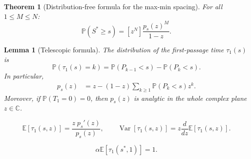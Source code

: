 \documentclass[10pt,a4paper]{amsart}
\newtheorem{lem}{Lemma}
\newtheorem{thm}{Theorem}
\def\C{{\mathbb C}}
\def\PP{{\mathbb P}}
\def\PR{\mathbb{P}}
\begin{document}
\begin{thm}[Distribution-free formula for the max-min spacing]
\label{thm:main}
For all $1\leq M\leq N$:
\begin{equation}\label{eq:main}
\PR(S^* \geq s)
   = [z^N]\frac{p_s(z)^M}{1-z}.
\end{equation}

\end{thm}

\begin{lem}[Telescopic formula] 
\label{lem:telescopic} The distribution of the first-passage time $\tau_1(s)$ is 
\begin{equation}
  \PR(\tau_1(s)=k)= \PR(P_{k-1}< s)-\PR(P_{k}< s).
  \label{eq:PL}
\end{equation}
In particular,
\begin{equation}
\begin{aligned}
       p_s(z)
        &=z-(1-z)\sum_{k\geq1}\PR(P_{k}< s)z^{k}.
    \label{eq:pgf-telescopic} 
\end{aligned}
\end{equation}
 Moreover, if $\PP(T_1=0)=0$, then $p_s(z)$ is analytic in the whole complex plane $z\in\C$.
\end{lem}

\begin{equation}\label{eq:TiltedMeanVar}
\mathbb{E}[\tau_1(s,z)]
= \frac{z\;p_s'(z)}{p_s(z)},
\qquad
\operatorname{Var}[\tau_1(s,z)]
 = z\frac{d}{dz}\mathbb{E}[\tau_1(s,z)].  
\end{equation}

\begin{equation}\label{eq:typical}
\alpha \mathbb{E}[\tau_1({s^*},1)]=1.
\end{equation}
\end{document}

